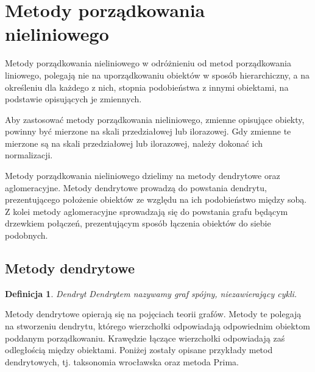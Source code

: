 \documentclass[12pt,a4paper]{report}
\newtheorem{definition}[theorem]{Definicja}
\begin{document}
\section{Metody porządkowania nieliniowego}


Metody porządkowania nieliniowego w odróżnieniu od metod porządkowania liniowego, polegają nie na uporządkowaniu obiektów w sposób hierarchiczny, a na określeniu dla każdego z nich, stopnia podobieństwa z innymi obiektami, na podstawie opisujących je zmiennych. 

Aby zastosować metody porządkowania nieliniowego, zmienne opisujące obiekty, powinny być mierzone na skali przedziałowej lub ilorazowej. Gdy zmienne te mierzone są na skali przedziałowej lub ilorazowej, należy dokonać ich normalizacji.

Metody porządkowania nieliniowego dzielimy na metody dendrytowe oraz aglomeracyjne. Metody dendrytowe prowadzą do powstania dendrytu, prezentującego położenie obiektów ze względu na ich podobieństwo między sobą. Z kolei metody aglomeracyjne sprowadzają się do powstania grafu będącym drzewkiem połączeń, prezentującym sposób łączenia obiektów do siebie podobnych. 

\subsection{Metody dendrytowe}

\begin{definition}{Dendryt \cite[Rozdział 2.3]{panek2013}}
Dendrytem nazywamy graf spójny, niezawierający cykli. 
\end{definition}

Metody dendrytowe opierają się na pojęciach teorii grafów. Metody te polegają na stworzeniu dendrytu, którego wierzchołki odpowiadają odpowiednim obiektom poddanym porządkowaniu. Krawędzie łączące wierzchołki odpowiadają zaś odległością między obiektami. Poniżej zostały opisane przykłady metod dendrytowych, tj. taksonomia wrocławska oraz metoda Prima. 
\end{document}

